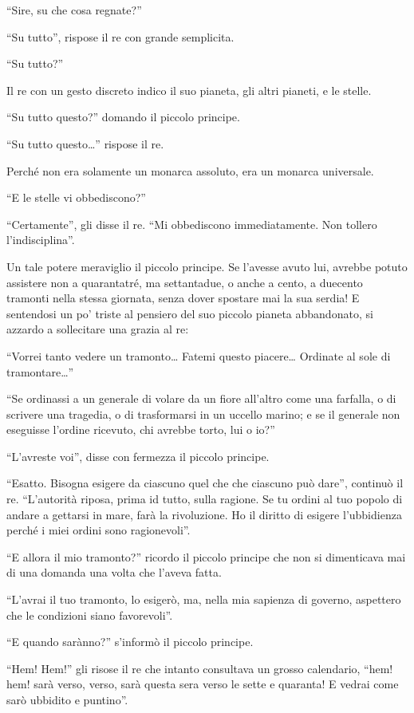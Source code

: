 \documentclass[11pt]{scrbook}
\begin{document}
``Sire, su che cosa regnate?''

``Su tutto'', rispose il re con grande semplicita.

``Su tutto?''

Il re con un gesto discreto indico il suo pianeta, gli altri pianeti, e
le stelle.

``Su tutto questo?'' domando il piccolo principe.

``Su tutto questo\ldots{}'' rispose il re.

Perché non era solamente un monarca assoluto, era un monarca universale.

``E le stelle vi obbediscono?''

``Certamente'', gli disse il re. ``Mi obbediscono immediatamente. Non
tollero l'indisciplina''.

Un tale potere meraviglio il piccolo principe. Se l'avesse avuto lui,
avrebbe potuto assistere non a quarantatré, ma settantadue, o anche a
cento, a duecento tramonti nella stessa giornata, senza dover spostare
mai la sua serdia! E sentendosi un po' triste al pensiero del suo
piccolo pianeta abbandonato, si azzardo a sollecitare una grazia al re:

``Vorrei tanto vedere un tramonto\ldots{} Fatemi questo piacere\ldots{}
Ordinate al sole di tramontare\ldots{}''

``Se ordinassi a un generale di volare da un fiore all'altro come una
farfalla, o di scrivere una tragedia, o di trasformarsi in un uccello
marino; e se il generale non eseguisse l'ordine ricevuto, chi avrebbe
torto, lui o io?''

``L'avreste voi'', disse con fermezza il piccolo principe.

``Esatto. Bisogna esigere da ciascuno quel che che ciascuno può dare'',
continuò il re. ``L'autorità riposa, prima id tutto, sulla ragione. Se
tu ordini al tuo popolo di andare a gettarsi in mare, farà la
rivoluzione. Ho il diritto di esigere l'ubbidienza perché i miei ordini
sono ragionevoli''.

``E allora il mio tramonto?'' ricordo il piccolo principe che non si
dimenticava mai di una domanda una volta che l'aveva fatta.

``L'avrai il tuo tramonto, lo esigerò, ma, nella mia sapienza di
governo, aspettero che le condizioni siano favorevoli''.

``E quando sarànno?'' s'informò il piccolo principe.

``Hem! Hem!'' gli risose il re che intanto consultava un grosso
calendario, ``hem! hem! sarà verso, verso, sarà questa sera verso le
sette e quaranta! E vedrai come sarò ubbidito e puntino''.
\end{document}

